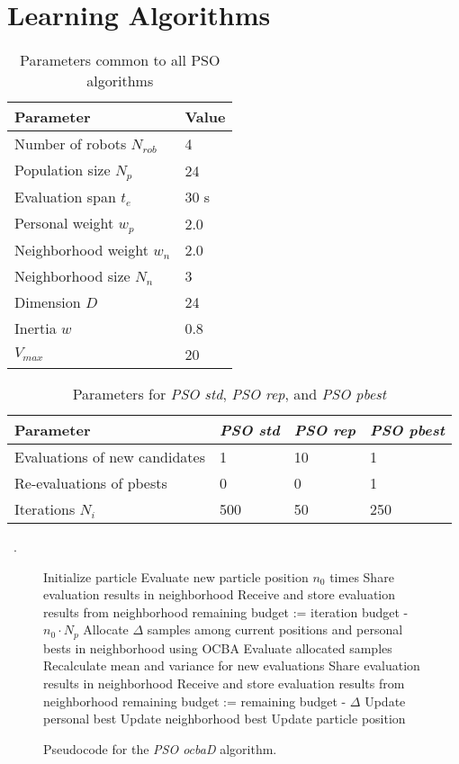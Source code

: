 \section{Learning Algorithms}
\label{sec:algorithms}


\begin{table}
\centering
\caption{Parameters common to all PSO algorithms}
\label{table:pso_common_params}
\begin{tabular}{l l}
\hline
Parameter & Value\\
\hline
Number of robots $N_{rob}$ & 4\\
Population size $N_p$ & 24\\
Evaluation span $t_e$ & 30 s\\
Personal weight $w_p$ & 2.0\\
Neighborhood weight $w_n$ & 2.0\\
Neighborhood size $N_n$ & 3\\
Dimension $D$ & 24\\
Inertia $w$ & 0.8\\
$V_{max}$ & 20\\
\hline
\end{tabular}
\end{table}

\begin{table}
\centering
\caption{Parameters for \emph{PSO std}, \emph{PSO rep}, and \emph{PSO pbest}}
\label{table:pso_params_std_rep_pbest}
\begin{tabular}{l l l l}
\hline
Parameter & \emph{PSO std} & \emph{PSO rep} & \emph{PSO pbest}\\
\hline
Evaluations of new candidates & 1 & 10 & 1\\
Re-evaluations of pbests & 0 & 0 & 1\\
Iterations $N_i$ & 500 & 50 & 250\\
\hline
\end{tabular}
\end{table}

~\cite{arras2007}. 
	
\begin{figure}
\hrulefill

\begin{algorithmic}[1]
\STATE Initialize particle
	\STATE Evaluate new particle position $n_0$ times
	\STATE Share evaluation results in neighborhood
	\STATE Receive and store evaluation results from neighborhood
	\STATE remaining budget := iteration budget - $n_0 \cdot N_p$ 
		\STATE Allocate $\Delta$ samples among current positions and personal bests in neighborhood using OCBA
		\STATE Evaluate allocated samples
		\STATE Recalculate mean and variance for new evaluations		
		\STATE Share evaluation results in neighborhood
		\STATE Receive and store evaluation results from neighborhood		
		\STATE remaining budget := remaining budget - $\Delta$
	\ENDWHILE
	\STATE Update personal best
	\STATE Update neighborhood best
	\STATE Update particle position	
\ENDFOR
\end{algorithmic}
\hrulefill
\caption{Pseudocode for the \emph{PSO ocbaD} algorithm.}
\label{fig:pso_ocbaD_algo}
\end{figure}

